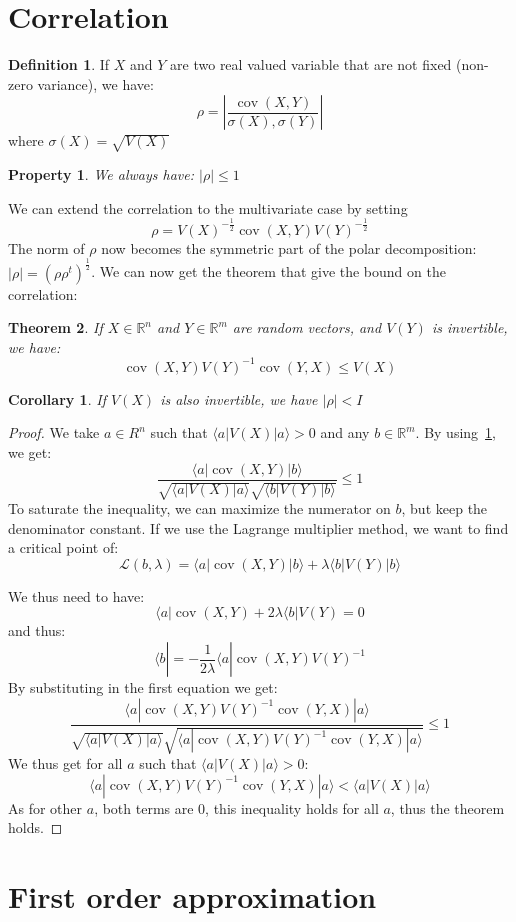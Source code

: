 \documentclass[10pt]{report}
\theoremstyle{plain}
\newtheorem{thm}{Theorem}[chapter]
\newtheorem{prop}[thm]{Property}
\newtheorem{cor}{Corollary}[thm]
\theoremstyle{definition}
\newtheorem{defn}{Definition}[chapter]
\theoremstyle{remark}
\newcommand{\R}{\ensuremath{\mathbb{R}}}
\newcommand{\ket}[1]{|#1\rangle}
\newcommand{\bra}[1]{\langle#1|}
\renewcommand{\leq}{\leqslant}
\DeclareMathOperator{\cov}{cov}
\begin{document}
\section{Correlation}\label{sec:correl}

\begin{defn}
  If $X$ and $Y$ are two real valued variable that are not fixed (non-zero
  variance), we have:
  \[\rho = \left|\frac {\cov(X,Y)}{\sigma(X),\sigma(Y)}\right|\]
  where $\sigma(X) = \sqrt{V(X)}$
\end{defn}

\begin{prop}\label{prop:correl1}
  We always have: $|\rho| \le 1$
\end{prop}

We can extend the correlation to the multivariate case by setting
\[\rho = {V(X)}^{-\frac12}\cov(X,Y){V(Y)}^{-\frac12}\]
The norm of $\rho$ now becomes the symmetric part of the polar decomposition:  $|\rho|
= {(\rho\rho^t)}^{\frac12}$. We can now get the theorem that give the bound on the
correlation:

\begin{thm}\label{thm:correln}
  If $X \in \R^n$ and $Y \in \R^m$ are random vectors, and $V(Y)$ is invertible,
  we have:
  \[\cov(X,Y){V(Y)}^{-1}\cov(Y,X) \leq V(X)\]
\end{thm}

\begin{cor}
  If $V(X)$ is also invertible, we have $|\rho| < I$
\end{cor}

\begin{proof}
  We take $a \in R^n$ such that $\bra a V(X) \ket a > 0$ and any $b \in \R^m$.
  By using~\cref{prop:correl1}, we get:
  \[ \frac{ \bra a \cov(X,Y) \ket b}{\sqrt{\bra a V(X) \ket a}\sqrt{\bra b V(Y)
        \ket b}} \leq 1\]
  To saturate the inequality, we can maximize the numerator on $b$, but keep the
  denominator constant. If we use the Lagrange multiplier method, we want to
  find a critical point of:
  \[\mathcal{L}(b,\lambda) = \bra a \cov(X,Y) \ket b + \lambda \bra b V(Y) \ket
    b\]

  We thus need to have:
  \[ \bra a \cov(X,Y) + 2\lambda\bra b V(Y) = 0\]
  and thus:
  \[ \bra b = - \frac 1 {2\lambda} \bra a \cov(X,Y) {V(Y)}^{-1}\]
  By substituting in the first equation we get:
  \[ \frac{ \bra a \cov(X,Y) {V(Y)}^{-1} \cov(Y,X) \ket a}
    {\sqrt{\bra a V(X) \ket a}
      \sqrt{\bra a \cov(X,Y) {V(Y)}^{-1} \cov(Y,X) \ket a}} \leq 1\]
  We thus get for all $a$ such that $\bra a V(X) \ket a > 0$:
  \[ \bra a \cov(X,Y) {V(Y)}^{-1} \cov(Y,X) \ket a < \bra a V(X) \ket a\]
  As for other $a$, both terms are 0, this inequality holds for all $a$, thus
  the theorem holds.
\end{proof}



\section{First order approximation}
\end{document}
